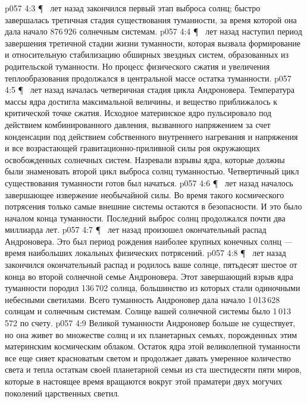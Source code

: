 \vs p057 4:3 \P\  лет назад закончился первый этап выброса солнц; быстро завершалась третичная стадия существования туманности, за время которой она дала начало 876\,926 солнечным системам.
\vs p057 4:4 \P\  лет назад наступил период завершения третичной стадии жизни туманности, которая вызвала формирование и относительную стабилизацию обширных звездных систем, образованных из родительской туманности. Но процесс физического сжатия и увеличения теплообразования продолжался в центральной массе остатка туманности.
\vs p057 4:5 \P\  лет назад началась четверичная стадия цикла Андроновера. Температура массы ядра достигла максимальной величины, и вещество приближалось к критической точке сжатия. Исходное материнское ядро пульсировало под действием комбинированного давления, вызванного напряжением за счет конденсации под действием собственного внутреннего нагревания и напряжения и все возрастающей гравитационно\hyp{}приливной силы роя окружающих освобожденных солнечных систем. Назревали взрывы ядра, которые должны были знаменовать второй цикл выброса солнц туманностью. Четвертичный цикл существования туманности готов был начаться.
\vs p057 4:6 \P\  лет назад началось завершающее извержение необычайной силы. Во время такого космического потрясения только самые внешние системы остаются в безопасности. И это было началом конца туманности. Последний выброс солнц продолжался почти два миллиарда лет.
\vs p057 4:7 \P\  лет назад произошел окончательный распад Андроновера. Это был период рождения наиболее крупных конечных солнц --- время наибольших локальных физических потрясений.
\vs p057 4:8 \P\  лет назад закончился окончательный распад и родилось ваше солнце, пятьдесят шестое от конца во второй солнечной семье Андроновера. Этот завершающий взрыв ядра туманности породил 136\,702 солнца, большинство из которых стали одиночными небесными светилами. Всего туманность Андроновер дала начало 1\,013\,628 солнцам и солнечным системам. Солнце вашей солнечной системы было 1\,013\,572 по счету.
\vs p057 4:9 Великой туманности Андроновер больше не существует, но она живет во множестве солнц и их планетарных семьях, порожденных этим материнским космическим облаком. Остаток ядра этой великолепной туманности все еще сияет красноватым светом и продолжает давать умеренное количество света и тепла остаткам своей планетарной семьи из ста шестидесяти пяти миров, которые в настоящее время вращаются вокруг этой праматери двух могучих поколений царственных светил.
